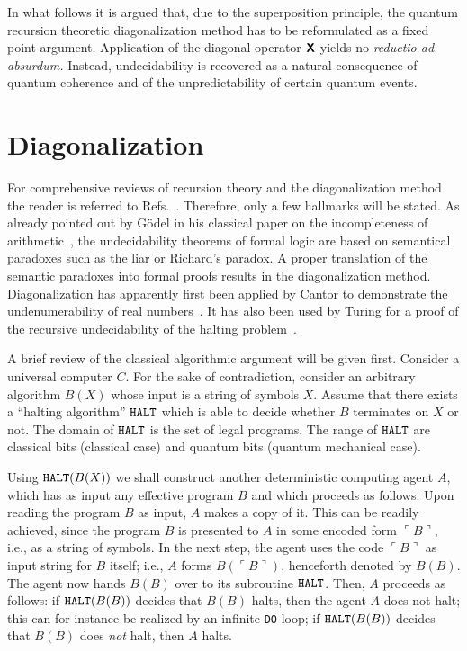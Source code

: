 \documentclass[prl,amsfonts,amsmath,showpacs,showkeys,preprint]{revtex4}
\begin{document}
In what follows it is argued that, due to the superposition principle,
the quantum recursion theoretic
diagonalization method has to be reformulated as a fixed point argument.
Application of the diagonal operator $\textsf{\textbf{X}}$ yields no {\em reductio ad absurdum.}
Instead, undecidability is recovered as a natural consequence of quantum coherence and of the
unpredictability of certain quantum events.


\section{Diagonalization}

For comprehensive reviews of recursion theory and the
diagonalization method the reader
is referred to Refs.~\cite{rogers1,davis,Barwise-handbook-logic,enderton72,odi:89,Boolos-07}.
Therefore, only a few hallmarks will be stated.
As already  pointed out by G\"odel
in his classical paper on the incompleteness of arithmetic~\cite{godel1},
the undecidability theorems of formal logic \cite{davis}
are based on semantical paradoxes
such as the liar
\cite{martin} or Richard's paradox.
A proper translation of the semantic paradoxes into formal proofs results in the diagonalization method.
Diagonalization has apparently first been applied by
Cantor to demonstrate the undenumerability of real numbers~\cite{cantor}. It has also been used by Turing for a proof
of the recursive undecidability of the halting problem~\cite{turing-36}.


A brief review of the classical algorithmic argument will be given
first.  Consider a universal computer $C$. For the sake of
contradiction, consider an arbitrary algorithm
$B(X)$ whose input is a string of symbols $X$.  Assume that there exists
a ``halting algorithm'' ${\tt HALT}$ which is able to decide whether $B$
terminates on $X$ or not.
The domain of ${\tt HALT}$  is the set of legal programs.
The range of ${\tt HALT}$ are classical bits (classical case) and quantum bits (quantum
mechanical case).

Using ${\tt HALT}(B(X))$ we shall construct another deterministic
computing agent $A$, which has as input any effective program $B$ and
which proceeds as follows:  Upon reading the program $B$ as input, $A$
makes a copy of it.  This can be readily achieved, since the program $B$
is presented to $A$ in some encoded form
$\ulcorner B\urcorner $,
i.e., as a string of
symbols.  In the next step, the agent uses the code
$\ulcorner B\urcorner $
 as input
string for $B$ itself; i.e., $A$ forms  $B(\ulcorner B\urcorner )$,
henceforth denoted by
$B(B)$.  The agent now hands $B(B)$ over to its subroutine ${\tt HALT}$.
Then, $A$ proceeds as follows:  if ${\tt HALT}(B(B))$ decides that
$B(B)$ halts, then the agent $A$ does not halt; this can for instance be
realized by an infinite {\tt DO}-loop; if ${\tt HALT}(B(B))$ decides
that $B(B)$ does {\em not} halt, then $A$ halts.
\end{document}
